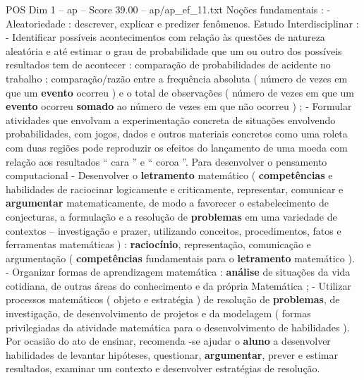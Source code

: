 \begin{textsample}{POS Dim 1 – ap – Score 39.00 – ap/ap\_ef\_11.txt}
Noções fundamentais : - Aleatoriedade : descrever, explicar e predizer fenômenos.
Estudo Interdisciplinar : - Identificar possíveis acontecimentos com relação às questões de natureza aleatória e até estimar o grau de probabilidade que um ou outro dos possíveis resultados tem de acontecer : comparação de probabilidades de acidente no trabalho ; comparação/razão entre a frequência absoluta ( número de vezes em que um \textbf{evento} ocorreu ) e o total de observações ( número de vezes em que um \textbf{evento} ocorreu \textbf{somado} ao número de vezes em que não ocorreu ) ; - Formular atividades que envolvam a experimentação concreta de situações envolvendo probabilidades, com jogos, dados e outros materiais concretos como uma roleta com duas regiões pode reproduzir os efeitos do lançamento de uma moeda com relação aos resultados “ cara ” e “ coroa ”.
Para desenvolver o pensamento computacional - Desenvolver o \textbf{letramento} matemático ( \textbf{competências} e habilidades de raciocinar logicamente e criticamente, representar, comunicar e \textbf{argumentar} matematicamente, de modo a favorecer o estabelecimento de conjecturas, a formulação e a resolução de \textbf{problemas} em uma variedade de contextos – investigação e prazer, utilizando conceitos, procedimentos, fatos e ferramentas matemáticas ) : \textbf{raciocínio}, representação, comunicação e argumentação ( \textbf{competências} fundamentais para o \textbf{letramento} matemático ). - Organizar formas de aprendizagem matemática : \textbf{análise} de situações da vida cotidiana, de outras áreas do conhecimento e da própria Matemática ; - Utilizar processos matemáticos ( objeto e estratégia ) de resolução de \textbf{problemas}, de investigação, de desenvolvimento de projetos e da modelagem ( formas privilegiadas da atividade matemática para o desenvolvimento de habilidades ).
Por ocasião do ato de ensinar, recomenda -se ajudar o \textbf{aluno} a desenvolver habilidades de levantar hipóteses, questionar, \textbf{argumentar}, prever e estimar resultados, examinar um contexto e desenvolver estratégias de resolução.

\end{textsample}
